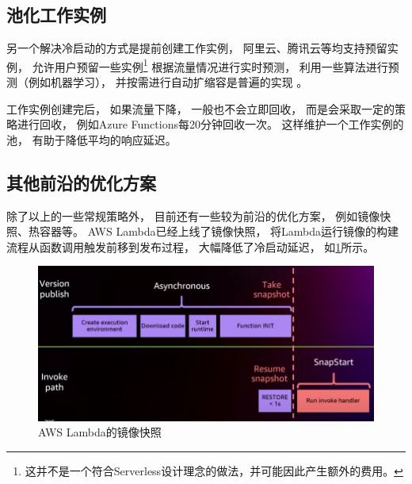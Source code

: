 \subsection{池化工作实例}
另一个解决冷启动的方式是提前创建工作实例，
阿里云、腾讯云等均支持预留实例，
允许用户预留一些实例\footnote{这并不是一个符合Serverless设计理念的做法，并可能因此产生额外的费用。}
根据流量情况进行实时预测，
利用一些算法进行预测（例如机器学习），
并按需进行自动扩缩容是普遍的实现
\cite{tecent_faas_cold_start,aws_lambda_2022,meituan_serverless_nest}。

工作实例创建完后，
如果流量下降，
一般也不会立即回收，
而是会采取一定的策略进行回收，
例如Azure Functions每20分钟回收一次\cite{aure_functions_cold_start}。
这样维护一个工作实例的池，
有助于降低平均的响应延迟。

\subsection{其他前沿的优化方案}
除了以上的一些常规策略外，
目前还有一些较为前沿的优化方案，
例如镜像快照、热容器等\cite{carreira2021warm, mohan2019agile}。
AWS Lambda已经上线了镜像快照，
将Lambda运行镜像的构建流程从函数调用触发前移到发布过程，
大幅降低了冷启动延迟，
如\cref{lambda_snapshot}所示。

\begin{figure}[ht!]
    \centering
    \includegraphics[width=\linewidth]{images/lambda_snapshot.png}
    \caption{AWS Lambda的镜像快照\cite{aws_lambda_2022}}
    \label{lambda_snapshot}
\end{figure}